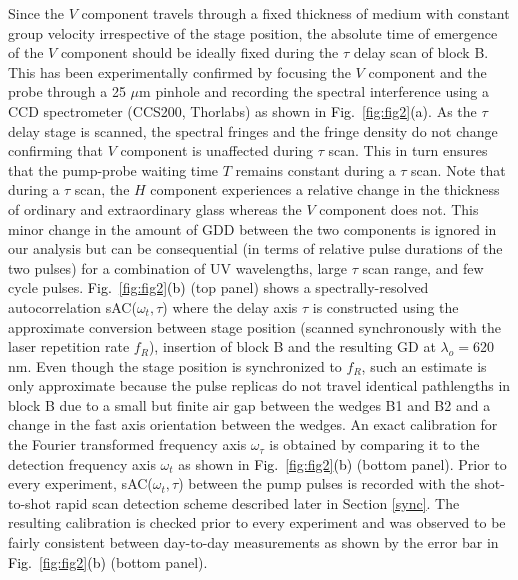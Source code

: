 \documentclass[%
aip,
amsmath,amssymb,
preprint,%
]{revtex4-2}
\newcommand*{\si}[1]{\textcolor{black}{ #1}}
\begin{document}
Since the $V$ component travels through a fixed thickness of medium with constant group velocity irrespective of the stage position, the absolute time of emergence of the $V$ component should be ideally fixed during the $\tau$ delay scan of block B. This has been experimentally confirmed by focusing the $V$ component and the probe through a 25 $\mu$m pinhole and recording the spectral interference using a CCD spectrometer (CCS200, Thorlabs) as shown in \si{Fig.~\ref{fig:fig2}(a)}.  As the $\tau$ delay stage is scanned, the spectral fringes and the fringe density do not change confirming that $V$ component is unaffected during $\tau$ scan. This in turn ensures that the pump-probe waiting time $T$ remains constant during a $\tau$ scan. Note that during a $\tau$ scan, the $H$ component experiences a relative change in the thickness of ordinary and extraordinary glass whereas the $V$ component does not. This minor change in the amount of GDD between the two components is ignored in our analysis but can be consequential\cite{Cerullo2014} (in terms of relative pulse durations of the two pulses) for a combination of UV wavelengths, large $\tau$ scan range, and few cycle pulses. \si{Fig.~\ref{fig:fig2}(b)} (top panel) shows a spectrally-resolved autocorrelation sAC($\omega_t,\tau$) where the delay axis $\tau$ is constructed using the approximate conversion between stage position (scanned synchronously with the laser repetition rate $f_R$), insertion of block B and the resulting GD at $\lambda_o = $620 nm. Even though the stage position is synchronized to $f_R$, such an estimate is only approximate because the pulse replicas do not travel identical pathlengths in block B due to a small but finite air gap between the wedges B1 and B2 and a change in the fast axis orientation between the wedges. An exact calibration for the Fourier transformed frequency axis $\omega_{\tau}$ is obtained by comparing it to the detection frequency axis $\omega_t$ as shown in \si{Fig.~\ref{fig:fig2}(b)} (bottom panel). Prior to every experiment, sAC($\omega_t,\tau$) between the pump pulses is recorded with the shot-to-shot rapid scan detection scheme described later in Section \ref{sync}. The resulting calibration is checked prior to every experiment and was observed to be fairly consistent between day-to-day measurements as shown by the error bar in \si{Fig.~\ref{fig:fig2}(b)} (bottom panel). \\
\end{document}
